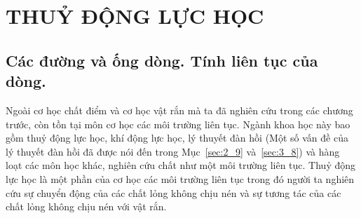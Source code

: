 

\chapter{THUỶ ĐỘNG LỰC HỌC}\label{chap:9}


\section{Các đường và ống dòng. Tính liên tục của dòng.}\label{sec:9_1}


Ngoài cơ học chất điểm và cơ học vật rắn mà ta đã nghiên cứu trong các chương trước, còn tồn tại môn cơ học các môi trường liên tục. Ngành khoa học này bao gồm thuỷ động lực học, khí động lực học, lý thuyết đàn hồi (Một số vấn đề của lý thuyết đàn hồi đã được nói đến trong Mục~\ref{sec:2_9} và~\ref{sec:3_8}) và hàng loạt các môn học khác, nghiên cứu chất như một môi trường liên tục. Thuỷ động lực học là một phần của cơ học các môi trường liên tục trong đó người ta nghiên cứu sự chuyển động của các chất lỏng không chịu nén và sự tương tác của các chất lỏng không chịu nén với vật rắn.


